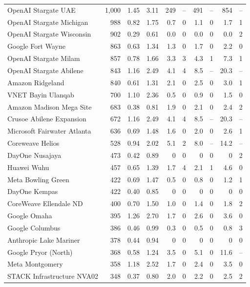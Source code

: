 {\begin{longtable}{@{}lrrrrrrrrr@{}}
OpenAI Stargate UAE & 1,000 & 1.45 & 3.11 & 249 & -- & 491 & -- & 854 & -- \\
OpenAI Stargate Michigan & 988 & 0.82 & 1.75 & 0.7 & 0 & 1.1 & 0 & 1.7 & 1 \\
OpenAI Stargate Wisconsin & 902 & 0.29 & 0.61 & 0.0 & 0 & 0.0 & 0 & 0.0 & 2 \\
Google Fort Wayne & 863 & 0.63 & 1.34 & 1.3 & 0 & 1.7 & 0 & 2.2 & 0 \\
OpenAI Stargate Milam & 857 & 0.78 & 1.66 & 3.3 & 3 & 4.3 & 1 & 7.3 & 1 \\
OpenAI Stargate Abilene & 843 & 1.16 & 2.49 & 4.1 & 4 & 8.5 & -- & 20.3 & -- \\
Amazon Ridgeland & 840 & 0.61 & 1.31 & 2.1 & 0 & 2.5 & 0 & 3.0 & 1 \\
VNET Bayin Ulanqab & 700 & 1.10 & 2.36 & 0.5 & 0 & 0.9 & 0 & 1.5 & 0 \\
Amazon Madison Mega Site & 683 & 0.38 & 0.81 & 1.9 & 0 & 2.1 & 0 & 2.4 & 2 \\
Crusoe Abilene Expansion & 672 & 1.16 & 2.49 & 4.1 & 4 & 8.5 & -- & 20.3 & -- \\
Microsoft Fairwater Atlanta & 636 & 0.69 & 1.48 & 1.6 & 0 & 2.0 & 0 & 2.6 & 1 \\
Coreweave Helios & 528 & 0.94 & 2.02 & 5.1 & 2 & 8.0 & -- & 14.2 & -- \\
DayOne Nusajaya & 473 & 0.42 & 0.89 & 0 & 0 & 0 & 0 & 0 & 2 \\
Huawei Wuhu & 457 & 0.65 & 1.39 & 1.7 & 4 & 2.1 & 1 & 4.6 & 0 \\
Meta Bowling Green & 422 & 0.69 & 1.47 & 0.5 & 0 & 0.8 & 0 & 1.2 & 1 \\
DayOne Kempas & 422 & 0.40 & 0.85 & 0 & 0 & 0 & 0 & 0 & 0 \\
CoreWeave Ellendale ND & 400 & 0.70 & 1.50 & 1.0 & 0 & 1.4 & 0 & 1.8 & 2 \\
Google Omaha & 395 & 1.26 & 2.70 & 1.7 & 0 & 2.6 & 0 & 3.6 & 0 \\
Google Columbus & 386 & 0.46 & 0.99 & 0.3 & 0 & 0.5 & 0 & 0.8 & 3 \\
Anthropic Lake Mariner & 378 & 0.44 & 0.94 & 0 & 0 & 0 & 0 & 0 & 0 \\
Google Pryor (North) & 368 & 0.58 & 1.24 & 3.5 & 0 & 5.1 & 0 & 11.6 & -- \\
Meta Montgomery & 358 & 1.18 & 2.52 & 1.7 & 0 & 2.4 & 0 & 3.5 & 0 \\
STACK Infrastructure NVA02 & 348 & 0.37 & 0.80 & 2.0 & 0 & 2.2 & 0 & 2.5 & 2 \\

\end{longtable}}
